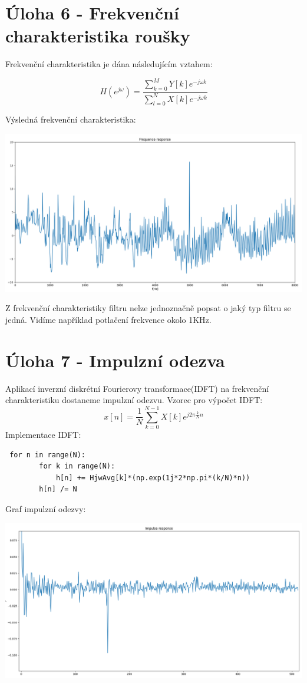 \documentclass[12pt,czech]{article}
\begin{document}
\section{Úloha 6 - Frekvenční charakteristika roušky}
    Frekvenční charakteristika je dána následujícím vztahem:
    
        \[H(e^{j\omega}) = \frac{\sum_{k = 0}^{M} Y[k]e^{-j\omega k}}
                                {\sum_{l = 0}^{N} X[k]e^{-j\omega k}} \]
    
    Výsledná frekvenční charakteristika:
    \begin{center}
        \hfill\includegraphics[scale=0.45]{images/frequence_response.png}\hspace*{\fill}
    \end{center}
    Z frekvenční charakteristiky filtru nelze jednoznačně popsat o jaký typ filtru se jedná. Vidíme například potlačení frekvence okolo 1KHz.
\clearpage
\section{Úloha 7 - Impulzní odezva}
Aplikací inverzní diskrétní Fourierovy transformace(IDFT) na frekvenční charakteristiku dostaneme impulzní odezvu.\newline
Vzorec pro výpočet IDFT:
    \[x[n] = \frac{1}{N} \sum_{k = 0}^{N - 1}X[k] e^{j2\pi\frac{k}{N}n}\]
Implementace IDFT:
\begin{lstlisting}
 for n in range(N): 
        for k in range(N):
            h[n] += HjwAvg[k]*(np.exp(1j*2*np.pi*(k/N)*n))
        h[n] /= N
\end{lstlisting}
Graf impulzní odezvy:
\begin{center}
\hfill\includegraphics[scale=0.45]{images/Impulse_response.png}\hspace*{\fill}
\end{center}
\end{document}
